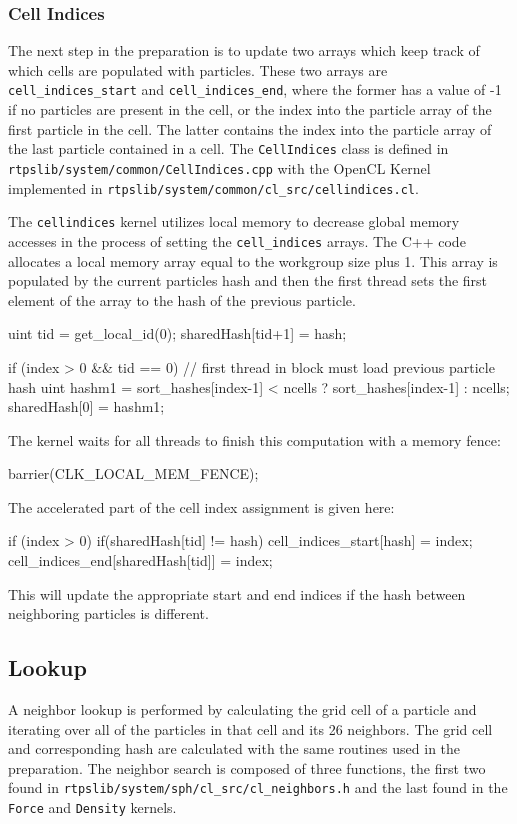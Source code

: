 \subsubsection{Cell Indices}
The next step in the preparation is to update two arrays which keep track of
which cells are populated with particles. These two arrays are
\verb|cell_indices_start| and \verb|cell_indices_end|, where the former has a
value of -1 if no particles are present in the cell, or the index into the
particle array of the first particle in the cell. The latter contains the index
into the particle array of the last particle contained in a cell.
The \verb|CellIndices| class is defined in
\verb|rtpslib/system/common/CellIndices.cpp| with the OpenCL Kernel implemented in
\verb|rtpslib/system/common/cl_src/cellindices.cl|.


The \verb|cellindices| kernel utilizes local memory to decrease global memory
accesses in the process of setting the \verb|cell_indices| arrays. 
The C++ code allocates a local memory array equal to the workgroup size plus 1.
This array is populated by the current particles hash and then the first thread
sets the first element of the array to the hash of the previous particle.
\begin{cppcode}{0}
uint tid = get_local_id(0);
sharedHash[tid+1] = hash; 

if (index > 0 && tid == 0)
{   
    // first thread in block must load previous particle hash
    uint hashm1 = sort_hashes[index-1] < ncells ? sort_hashes[index-1] : ncells;
    sharedHash[0] = hashm1;
}
\end{cppcode}

The kernel waits for all threads to finish this computation with a memory fence:
\begin{cppcode}{0}
barrier(CLK_LOCAL_MEM_FENCE);
\end{cppcode}

The accelerated part of the cell index assignment is given here:
\begin{cppcode}{0}
if (index > 0)
{
    if(sharedHash[tid] != hash)
    {
        cell_indices_start[hash] = index;
        cell_indices_end[sharedHash[tid]] = index;
    }
}
\end{cppcode}

This will update the appropriate start and end indices if the hash between
neighboring particles is different.

\subsection{Lookup}
A neighbor lookup is performed by calculating the grid cell of a particle and
iterating over all of the particles in that cell and its 26 neighbors. The grid
cell and corresponding hash are calculated with the same routines used in the
preparation. The neighbor search is composed of three functions, the first two
found in \verb|rtpslib/system/sph/cl_src/cl_neighbors.h| and the last found in
the \verb|Force| and \verb|Density| kernels.

